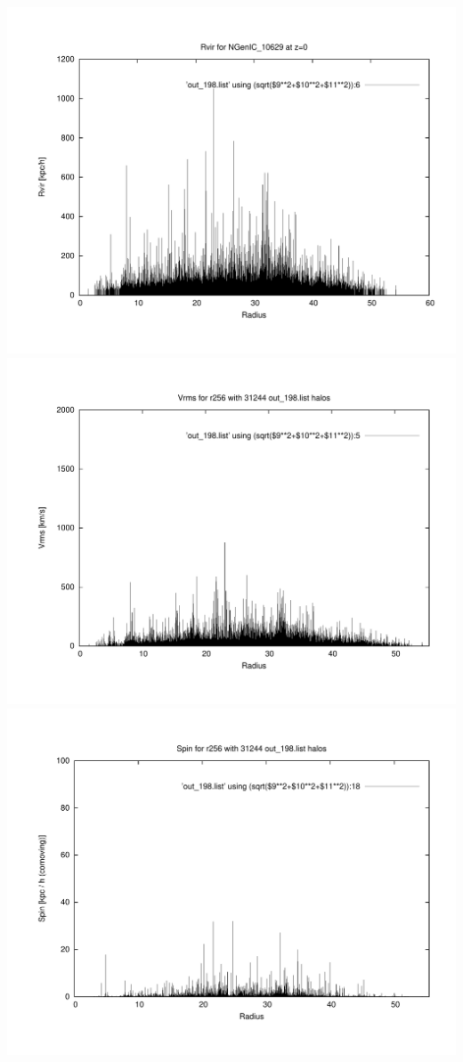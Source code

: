 \includegraphics[scale=0.3]{r256/NGenIC_10629/plot_rvir_z0.pdf}
\includegraphics[scale=0.3]{r256/NGenIC_10629/plot_Vrms_out_198.pdf}
\includegraphics[scale=0.3]{r256/NGenIC_10629/plot_spin_out_198.pdf}

